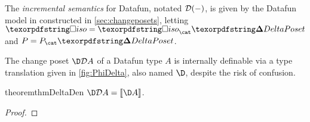 The \emph{incremental semantics} for Datafun, notated $\mathcal{D}({-})$, is given by
the Datafun model in \CP{} constructed in \cref{sec:changeposets}, letting
$\disco = \iso_\CP$ and $\pfin = \pfin_\CP$.


The change poset $\D\incdens A$ of a Datafun type $A$ is internally definable
via a type translation given in \cref{fig:PhiDelta}, also named $\D$, despite
the risk of confusion. 



\begin{restatable}{theorem}{thmDeltaDen}
  \label{thm:delta-den}
  \(\D\incdens A = \den{\D A}\).
\end{restatable}
\begin{proof}
\end{proof}
